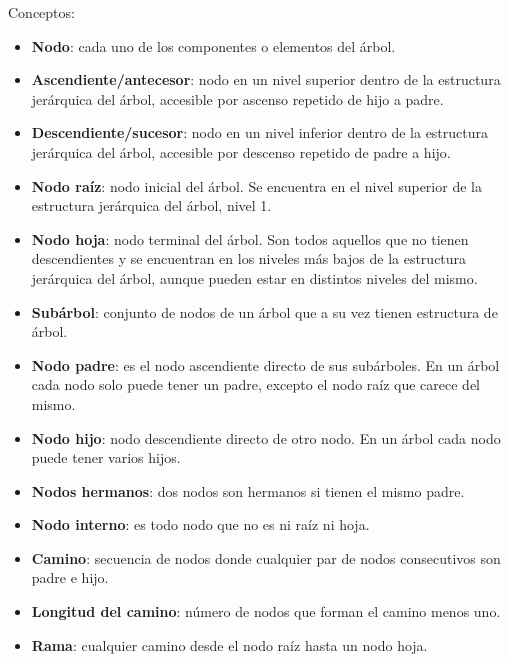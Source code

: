 \documentclass{article}
\begin{document}
Conceptos:
\begin{itemize}
    \item \textbf{Nodo}: cada uno de los componentes o elementos del árbol.

    \item \textbf{Ascendiente/antecesor}: nodo en un nivel superior dentro de la estructura jerárquica del árbol, accesible por ascenso repetido de hijo a padre.

    \item \textbf{Descendiente/sucesor}: nodo en un nivel inferior dentro de la estructura jerárquica del árbol, accesible por descenso repetido de  padre a hijo.

    \item \textbf{Nodo raíz}: nodo inicial del árbol. Se encuentra en el nivel superior de la estructura jerárquica del árbol, nivel 1.

    \item \textbf{Nodo hoja}: nodo terminal del árbol. Son todos aquellos que no tienen descendientes y se encuentran en los niveles más bajos de la estructura jerárquica del árbol, aunque pueden estar en distintos niveles del mismo.

    \item \textbf{Subárbol}: conjunto de nodos de un árbol que a su vez tienen estructura de árbol.

    \item \textbf{Nodo padre}: es el nodo ascendiente directo de sus subárboles. En un árbol cada nodo solo puede tener un padre, excepto el nodo raíz que carece del mismo.

    \item \textbf{Nodo hijo}: nodo descendiente directo de otro nodo. En un árbol cada nodo puede tener varios hijos.

    \item \textbf{Nodos hermanos}: dos nodos son hermanos si tienen el mismo padre.

    \item \textbf{Nodo interno}: es todo nodo que no es ni raíz ni hoja.

    \item \textbf{Camino}: secuencia de nodos donde cualquier par de nodos consecutivos son padre e hijo.

    \item \textbf{Longitud del camino}: número de nodos que forman el camino menos uno.

    \item \textbf{Rama}: cualquier camino desde el nodo raíz hasta un nodo hoja.


\end{itemize}
\end{document}
